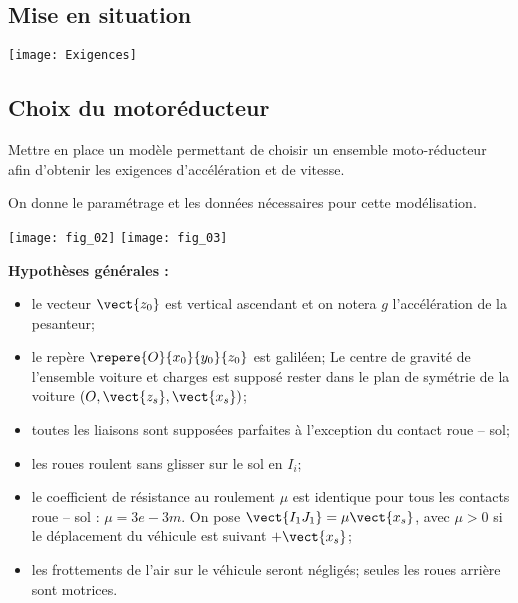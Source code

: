 \ifprof
\else
\begin{multicols}{2}
\fi

\section*{Mise en situation}
\ifprof
\else
\fi


\begin{center}
\texttt{[image: Exigences]}
\end{center}

\subsection*{Choix du motoréducteur}


\begin{obj}
Mettre en place un modèle permettant de choisir un ensemble moto-réducteur afin d’obtenir les
exigences d’accélération et de vitesse.
\end{obj}

On donne le paramétrage et les données nécessaires pour cette modélisation.


\begin{center}
\texttt{[image: fig\_02]}
\texttt{[image: fig\_03]}
\end{center}


\textbf{Hypothèses générales : }
\begin{itemize}
\item le vecteur $\vect{z_0}$ est vertical ascendant et on notera $g$ l'accélération de la pesanteur;
\item le repère $\repere{O}{x_0}{y_0}{z_0}$ est galiléen;
Le centre de gravité de l’ensemble voiture et charges est supposé rester dans le
plan de symétrie de la voiture $\left(O,\vect{z_s},\vect{x_s}\right)$;
\item toutes les liaisons sont supposées parfaites à l’exception du contact roue -- sol;
\item les roues roulent sans glisser sur le sol en $I_i$;
\item le coefficient de résistance au roulement $\mu$ est identique pour tous les contacts
roue -- sol : $\mu = \si{3e-3}{m}$. On pose $\vect{I_1J_1}=\mu \vect{x_s}$, avec $\mu >0$
si le déplacement du véhicule est suivant $+\vect{x_s}$;
\item les frottements de l’air sur le véhicule seront négligés;
seules les roues arrière sont motrices.
\end{itemize}


\end{multicols}
